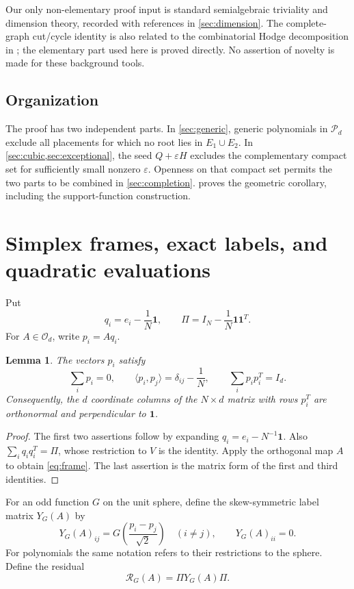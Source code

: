 \documentclass[11pt,reqno]{amsart}
\newtheorem{lemma}[lemma]{Lemma}
\theoremstyle{definition}
\theoremstyle{remark}
\numberwithin{equation}{section}
\newcommand{\one}{\mathbf 1}
\newcommand{\eps}{\varepsilon}
\newcommand{\Orth}{\mathcal O_d}
\newcommand{\Pol}{\mathcal P_d}
\newcommand{\ip}[2]{\langle #1,#2\rangle}
\begin{document}
Our only non-elementary proof input is standard semialgebraic
triviality and dimension theory, recorded with references in
\cref{sec:dimension}. The complete-graph cut/cycle identity is also
related to the combinatorial Hodge decomposition in
\cite{JiangLimYaoYe2011}; the elementary part used here is proved directly.
No assertion of novelty is made for these background tools.

\subsection{Organization}
The proof has two independent parts. In \cref{sec:generic}, generic
polynomials in $\Pol$ exclude all placements for which no root lies in
$E_1\cup E_2$. In \cref{sec:cubic,sec:exceptional}, the seed
$Q+\eps H$ excludes the complementary compact set for sufficiently
small nonzero $\eps$. Openness on that compact set permits the two
parts to be combined in \cref{sec:completion}.
 proves the geometric corollary, including the
support-function construction.

\section{Simplex frames, exact labels, and quadratic evaluations}
\label{sec:linear}

Put
\[
 q_i=e_i-\frac1N\one,\qquad
 \Pi=I_N-\frac1N\one\one^T.
\]
For $A\in\Orth$, write $p_i=Aq_i$.

\begin{lemma}\label{lem:frame}
The vectors $p_i$ satisfy
\begin{equation}\label{eq:frame}
 \sum_i p_i=0,\qquad
 \ip{p_i}{p_j}=\delta_{ij}-\frac1N,\qquad
 \sum_i p_ip_i^T=I_d.
\end{equation}
Consequently, the $d$ coordinate columns of the $N\times d$ matrix
with rows $p_i^T$ are orthonormal and perpendicular to $\one$.
\end{lemma}
\begin{proof}
The first two assertions follow by expanding $q_i=e_i-N^{-1}\one$.
Also $\sum_iq_iq_i^T=\Pi$, whose restriction to $V$ is the identity.
Apply the orthogonal map $A$ to obtain \eqref{eq:frame}. The last
assertion is the matrix form of the first and third identities.
\end{proof}

For an odd function $G$ on the unit sphere, define the skew-symmetric
label matrix $Y_G(A)$ by
\begin{equation}\label{eq:labels}
 Y_G(A)_{ij}=G\!\left(\frac{p_i-p_j}{\sqrt2}\right)
 \quad(i\ne j),\qquad Y_G(A)_{ii}=0.
\end{equation}
For polynomials the same notation refers to their restrictions to the
sphere. Define the residual
\begin{equation}\label{eq:residual}
 \mathcal R_G(A)=\Pi Y_G(A)\Pi.
\end{equation}
\end{document}
